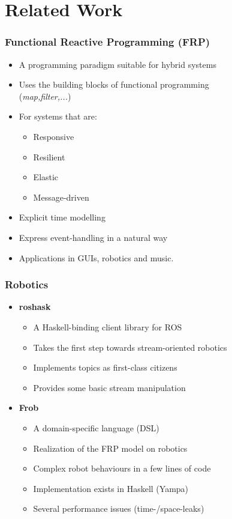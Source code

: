 \documentclass[hyperref={pdfpagelayout=SinglePage}]{beamer}
\newenvironment{mysubsec}[1]
{   \begin{frame}
	\frametitle{#1} }
{ \end{frame} }
\begin{document}
\section{Related Work}		
	\begin{mysubsec}{Functional Reactive Programming (FRP)}
		\begin{itemize}
		\item A programming paradigm suitable for hybrid systems
		\item Uses the building blocks of functional programming
		\\ (\textit{map,filter,...})
		\item For systems that are:
			\begin{itemize}
			\item Responsive
			\item Resilient	
			\item Elastic
			\item Message-driven
			\end{itemize}
		\item Explicit time modelling
		\item Express event-handling in a natural way
		\item Applications in GUIs, robotics and music.
		\end{itemize}
	\end{mysubsec}
	\begin{mysubsec}{Robotics}
		\begin{itemize}
		\item \textbf{roshask}
			\begin{itemize}
			\item A Haskell-binding client library for ROS
			\item Takes the first step towards stream-oriented robotics
			\item Implements topics as first-class citizens
			\item Provides some basic stream manipulation
			\end{itemize}
		\item \textbf{Frob}
			\begin{itemize}
			\item A domain-specific language (DSL)
			\item Realization of the FRP model on robotics
			\item Complex robot behaviours in a few lines of code
			\item Implementation exists in Haskell (Yampa)
			\item Several performance issues (time-/space-leaks)
			\end{itemize}			
		\end{itemize}
	\end{mysubsec}
\end{document}
